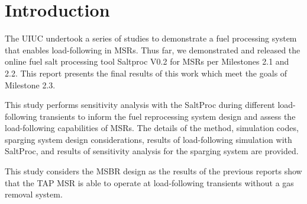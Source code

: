 \section{Introduction}

    The \gls{UIUC} undertook a series of 
    studies to demonstrate a fuel processing system that enables load-following 
    in \glspl{MSR}. Thus far, we demonstrated and released the 
    online fuel salt processing tool Saltproc V0.2 
    \cite{rykhlevskii_saltproc_2018} for \glspl{MSR} per Milestones 
    2.1 and 2.2. This report presents the final results of this work which 
    meet the goals of 
    Milestone 2.3.

    This study performs sensitivity analysis with the SaltProc during different 
    load-following transients to inform the fuel reprocessing system design and 
    assess the load-following capabilities of \glspl{MSR}. The details of the 
    method, simulation codes, sparging system design considerations, results of 
    load-following simulation with SaltProc, and results of sensitivity analysis 
    for the sparging system are provided.

    This study considers the \gls{MSBR}
    \cite{robertson_conceptual_1971} design as the results of the previous 
    reports \cite{rykhlevskii_milestone_2019} show that the TAP MSR is able to 
    operate at load-following transients without a gas removal system. 


